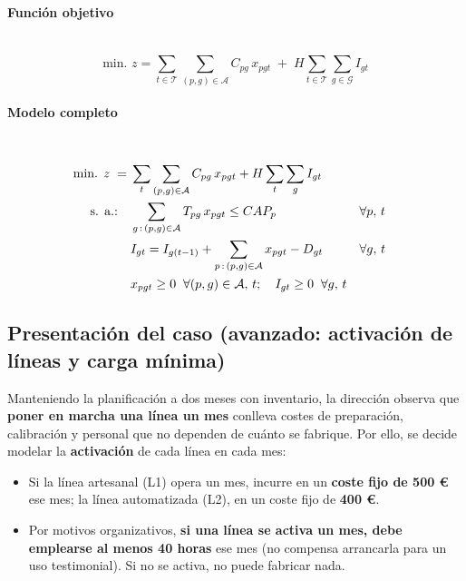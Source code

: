 \paragraph{Función objetivo}\mbox{}\\
\begin{equation}
\mbox{min. } z = \sum_{t\in\mathcal{T}} \sum_{(p,g)\in\mathcal{A}} C_{pg}\, x_{pgt} \;+\; H \sum_{t\in\mathcal{T}} \sum_{g\in\mathcal{G}} I_{gt}
\end{equation}

\paragraph{Modelo completo}\mbox{}\\
\begin{align}
\mbox{min. } z \;=\;& \sum_{t} \sum_{(p,g)\in\mathcal{A}} C_{pg}\, x_{pgt} + H \sum_{t}\sum_{g} I_{gt} \notag\\
\mbox{s. a.:}\quad
& \sum_{g\,:\,(p,g)\in\mathcal{A}} T_{pg}\, x_{pgt} \leq CAP_p && \forall p,\, t \notag\\
& I_{gt} = I_{g(t-1)} + \sum_{p\,:\,(p,g)\in\mathcal{A}} x_{pgt} - D_{gt} && \forall g,\, t \notag\\
& x_{pgt} \geq 0 \;\; \forall (p,g)\in\mathcal{A},\,t; \quad I_{gt} \geq 0 \;\; \forall g,\,t \notag
\end{align}


\subsection{Presentación del caso (avanzado: activación de líneas y carga mínima)}

Manteniendo la planificación a dos meses con inventario, la dirección observa que \textbf{poner en marcha una línea un mes} conlleva costes de preparación, calibración y personal que no dependen de cuánto se fabrique. Por ello, se decide modelar la \textbf{activación} de cada línea en cada mes:

\begin{itemize}
    \item Si la línea artesanal (L1) opera un mes, incurre en un \textbf{coste fijo de 500 €} ese mes; la línea automatizada (L2), en un coste fijo de \textbf{400 €}.
    \item Por motivos organizativos, \textbf{si una línea se activa un mes, debe emplearse al menos 40 horas} ese mes (no compensa arrancarla para un uso testimonial). Si no se activa, no puede fabricar nada.
\end{itemize}

